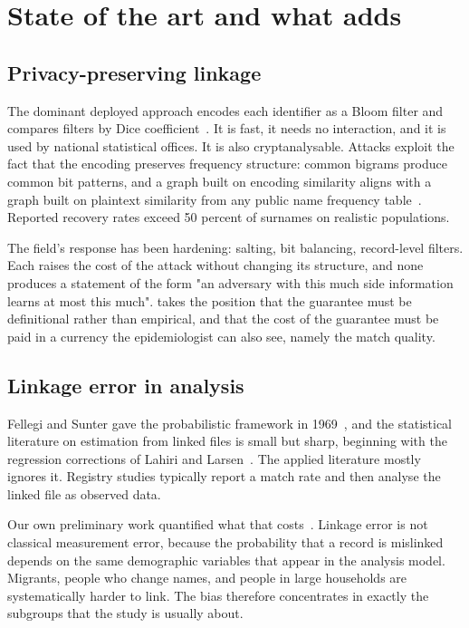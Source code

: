 \section{State of the art and what \proj{} adds}
\label{sec:sota}

\subsection{Privacy-preserving linkage}

The dominant deployed approach encodes each identifier as a Bloom filter and compares filters by
Dice coefficient~\cite{schnell2009bloom}. It is fast, it needs no interaction, and it is used by
national statistical offices. It is also cryptanalysable. Attacks exploit the fact that the
encoding preserves frequency structure: common bigrams produce common bit patterns, and a graph
built on encoding similarity aligns with a graph built on plaintext similarity from any public name
frequency table~\cite{christen2018attack,haugsdal2022graphattack}. Reported recovery rates exceed
50 percent of surnames on realistic populations.

The field's response has been hardening: salting, bit balancing, record-level filters. Each raises
the cost of the attack without changing its structure, and none produces a statement of the form
"an adversary with this much side information learns at most this much". \proj{} takes the position
that the guarantee must be definitional rather than empirical, and that the cost of the guarantee
must be paid in a currency the epidemiologist can also see, namely the match quality.

\subsection{Linkage error in analysis}

Fellegi and Sunter gave the probabilistic framework in 1969~\cite{fellegi1969theory}, and the
statistical literature on estimation from linked files is small but sharp, beginning with the
regression corrections of Lahiri and Larsen~\cite{lahiri2005regression}. The applied literature
mostly ignores it. Registry studies typically report a match rate and then analyse the linked file
as observed data.

Our own preliminary work quantified what that costs~\cite{okparalange2025linkageerror}. Linkage
error is not classical measurement error, because the probability that a record is mislinked
depends on the same demographic variables that appear in the analysis model. Migrants, people who
change names, and people in large households are systematically harder to link. The bias therefore
concentrates in exactly the subgroups that the study is usually about.

